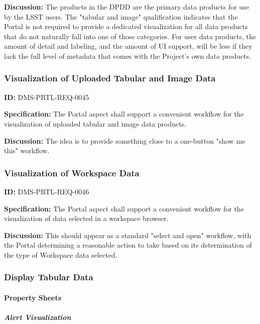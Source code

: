 \documentclass[SE,toc,lsstdraft]{lsstdoc}
\begin{document}
\textbf{Discussion:}
The products in the DPDD are the primary data products for use by the LSST users.  The "tabular and image" qualification indicates that the Portal is not required to provide a dedicated visualization for all data products that do not naturally fall into one of those categories.
For user data products, the amount of detail and labeling, and the amount of UI support, will be less if they lack the full level of metadata that comes with the Project's own data products.

\subsubsection{Visualization of Uploaded Tabular and Image Data}

\label{DMS-PRTL-REQ-0045}
\textbf{ID:} DMS-PRTL-REQ-0045

\textbf{Specification:}
The Portal aspect shall support a convenient workflow for the visualization of uploaded tabular and image data products.

\textbf{Discussion:}
The idea is to provide something close to a one-button "show me this" workflow.

\subsubsection{Visualization of Workspace Data}

\label{DMS-PRTL-REQ-0046}
\textbf{ID:} DMS-PRTL-REQ-0046

\textbf{Specification:}
The Portal aspect shall support a convenient workflow for the visualization of data selected in a workspace browser.

\textbf{Discussion:}
This should appear as a standard "select and open" workflow, with the Portal determining a reasonable action to take based on its determination of the type of Workspace data selected.

\subsubsection{Display Tabular Data}

\paragraph{Property Sheets}\hfill  %

\subparagraph{Alert Visualization}\hfill  %
\end{document}
